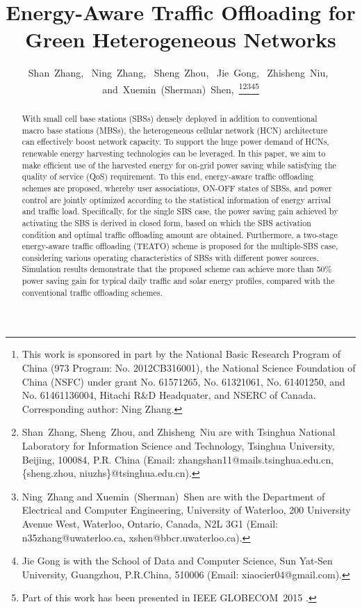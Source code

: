 \documentclass[12pt, draftclsnofoot,onecolumn]{IEEEtran}
\begin{document}
\title{Energy-Aware Traffic Offloading for Green Heterogeneous Networks}

\author{Shan~Zhang,~
        Ning~Zhang,~
        Sheng~Zhou,~
        Jie~Gong,~
        Zhisheng~Niu,~
        and~Xuemin~(Sherman)~Shen,~\thanks{This work is sponsored in part by the National Basic Research Program of China (973 Program: No. 2012CB316001), the National Science Foundation of China (NSFC) under grant No. 61571265, No. 61321061, No. 61401250, and No. 61461136004, Hitachi R\&D Headquater, and NSERC of Canada. Corresponding author: Ning Zhang.}\thanks{Shan~Zhang, Sheng~Zhou, and Zhisheng~Niu are with Tsinghua National Laboratory for Information Science and Technology, Tsinghua University, Beijing, 100084, P.R. China (Email: zhangshan11@mails.tsinghua.edu.cn, \{sheng.zhou, niuzhs\}@tsinghua.edu.cn).}\thanks{Ning~Zhang and Xuemin~(Sherman)~Shen are with the Department of Electrical and Computer Engineering, University of Waterloo, 200 University Avenue West, Waterloo, Ontario, Canada, N2L 3G1 (Email: n35zhang@uwaterloo.ca, xshen@bbcr.uwaterloo.ca).}\thanks{Jie Gong is with the School of Data and Computer Science, Sun Yat-Sen University, Guangzhou, P.R.China, 510006 (Email: xiaocier04@gmail.com).}\thanks{Part of this work has been presented in IEEE GLOBECOM~2015 \cite{mine_GC_EH}.}
}

\maketitle

\begin{abstract}

With small cell base stations (SBSs) densely deployed in addition to conventional macro base stations (MBSs), the heterogeneous cellular network (HCN) architecture can effectively boost network capacity.
To support the huge power demand of HCNs, renewable energy harvesting technologies can be leveraged.
In this paper, we aim to make efficient use of the harvested energy for on-grid power saving while satisfying the quality of service (QoS) requirement.
To this end, energy-aware traffic offloading schemes are proposed, whereby user associations, ON-OFF states of SBSs, and power control are jointly optimized according to the statistical information of energy arrival and traffic load.
Specifically, for the single SBS case, the power saving gain achieved by activating the SBS is derived in closed form, based on which the SBS activation condition and optimal traffic offloading amount are obtained.
Furthermore, a two-stage energy-aware traffic offloading (TEATO) scheme is proposed for the multiple-SBS case, considering various operating characteristics of SBSs with different power sources.
Simulation results demonstrate that the proposed scheme can achieve more than 50\% power saving gain for typical daily traffic and solar energy profiles, compared with the conventional traffic offloading schemes.
\end{abstract}
\end{document}
